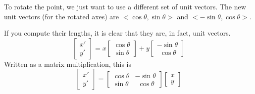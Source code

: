 \documentclass[11pt, oneside]{article}   	%
\begin{document}
To rotate the point, we just want to use a different set of unit vectors.  The new unit vectors (for the rotated axes) are $<\cos \theta,\sin \theta>$ and $<-\sin \theta,\cos \theta>$.  

If you compute their lengths, it is clear that they are, in fact, unit vectors.
\[
\begin{bmatrix}  x' \\ y' \end{bmatrix}
=
x
\begin{bmatrix}  \cos \theta \\ \sin \theta \end{bmatrix}
+
y
\begin{bmatrix}  -\sin \theta \\ \ \ \cos \theta \end{bmatrix}
\]
Written as a matrix multiplication, this is
\[
\begin{bmatrix}  x' \\ y' \end{bmatrix}
=
\begin{bmatrix}  
\cos \theta & -\sin \theta \\
\sin \theta & \ \  \cos \theta 
\end{bmatrix}
\begin{bmatrix}  x \\ y \end{bmatrix}
\]
\end{document}
